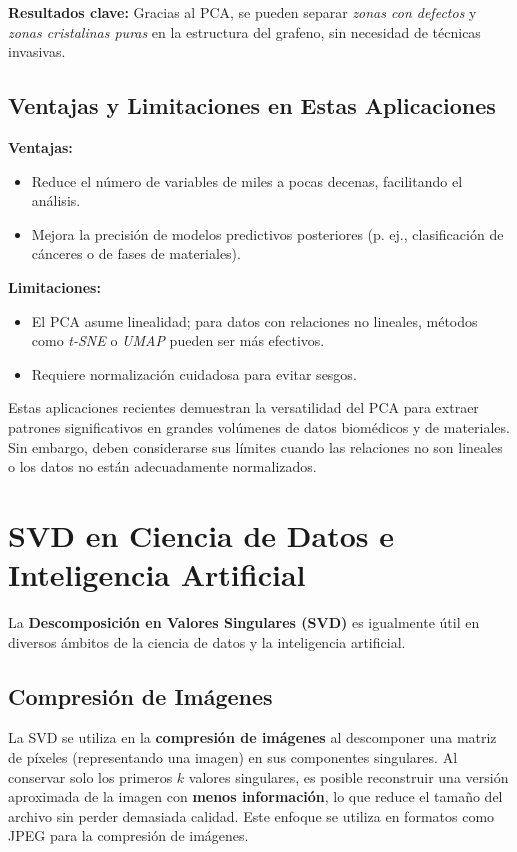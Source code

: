 \documentclass[12pt]{article}
\begin{document}
        \noindent
        
        \vspace{1em}
        \noindent
        \textbf{Resultados clave:} Gracias al PCA, se pueden separar \emph{zonas con defectos} y \emph{zonas cristalinas puras} en la estructura del grafeno, sin necesidad de técnicas invasivas.
        
        \subsection*{Ventajas y Limitaciones en Estas Aplicaciones}
        \textbf{Ventajas:}
        \begin{itemize}
                \item Reduce el número de variables de miles a pocas decenas, facilitando el análisis.
                \item Mejora la precisión de modelos predictivos posteriores (p. ej., clasificación de cánceres o de fases de materiales).
        \end{itemize}
        
        \textbf{Limitaciones:}
        \begin{itemize}
                \item El PCA asume linealidad; para datos con relaciones no lineales, métodos como \emph{t-SNE} o \emph{UMAP} pueden ser más efectivos.
                \item Requiere normalización cuidadosa para evitar sesgos.
        \end{itemize}
        
        \vspace{1em}
        \noindent
        Estas aplicaciones recientes demuestran la versatilidad del PCA para extraer patrones significativos en grandes volúmenes de datos biomédicos y de materiales. Sin embargo, deben considerarse sus límites cuando las relaciones no son lineales o los datos no están adecuadamente normalizados.
        
        \section*{SVD en Ciencia de Datos e Inteligencia Artificial}
        \noindent
        La \textbf{Descomposición en Valores Singulares (SVD)} es igualmente útil en diversos ámbitos de la ciencia de datos y la inteligencia artificial.
        
        \subsection*{Compresión de Imágenes}
        \noindent
        La SVD se utiliza en la \textbf{compresión de imágenes} al descomponer una matriz de píxeles (representando una imagen) en sus componentes singulares. Al conservar solo los primeros $k$ valores singulares, es posible reconstruir una versión aproximada de la imagen con \textbf{menos información}, lo que reduce el tamaño del archivo sin perder demasiada calidad. Este enfoque se utiliza en formatos como JPEG para la compresión de imágenes.
        
\end{document}
